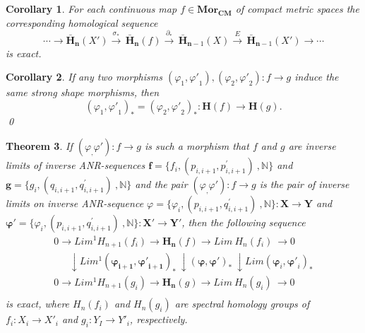\documentclass[10pt]{article}
\newtheorem{theorem}{Theorem}[section]
\newtheorem{corollary}[theorem]{Corollary}
\theoremstyle{definition}
\begin{document}
\begin{corollary} 
For each continuous map $f\in {\mathbf{Mor}}_{\mathbf{CM}}$ of compact metric spaces the corresponding homological sequence
	$$\cdots \to {{\mathbf{\bar{H}}}_{\mathbf{n}}}( {{X}'} )\overset{{{\sigma }_{*}}}{\mathop{\to }}\,{{\mathbf{\bar{H}}}_{\mathbf{n}}}( f )\overset{{{\partial }_{*}}}{\mathop{\to }}\,{{\mathbf{\bar{H}}}_{\mathbf{n}-1}}( X )\overset{E}{\mathop{\to }}\,{{\mathbf{\bar{H}}}_{\mathbf{n}-1}}( {{X}'} )\to \cdots $$
is exact.

\end{corollary}
\begin{corollary} 
If any two morphisms  $( {{\varphi }_{1}},{\varphi'} _{1} ),( {{\varphi }_{2}},{\varphi'} _{2} ):f\to g$ induce the same strong shape morphisms, then
$${{( {{\varphi }_{1}},{\varphi'} _{1} )}_{*}}={{( {{\varphi }_{2}},{\varphi'} _{2} )}_{*}}:\mathbf{H}( f )\to \mathbf{H}( g ).$$ \qed               
\end{corollary}
\begin{theorem} 
If $( {\varphi }_,{\varphi'} ):f\to g$  is such a morphism that $f$ and $g$ are inverse limits of inverse ANR-sequences  $\mathbf{f}= \{ {{f}_{i}},({{p}_{i,i+1}},p_{i,i+1}^{'})~,\mathbb{N} \}$ and $\mathbf{g}= \{ {{g}_{i}},({{q}_{i,i+1}},q_{i,i+1}^{'})~,\mathbb{N} \}$ and the pair $( {\varphi }_,{\varphi'} ):f\to g$ is the pair of inverse limits on inverse ANR-sequence ${\mathbb {\varphi}}= \{ {{\varphi}_{i}},({{p}_{i,i+1}},q_{i,i+1}^{'})~,\mathbb{N} \} : { \mathbf{X} \to \mathbf{Y}}$ and ${\mathbf{\varphi'}}= \{ {{\varphi}_{i}},({{p}_{i,i+1}},q_{i,i+1}^{'})~,\mathbb{N} \}: { \mathbf{X'} \to \mathbf{Y'}}$, then the following sequence 
$$
\begin{matrix}
   0\to Li{{m}^{1}}{{H}_{n+1}}( {{f}_{i}} )\to {{\mathbf{H}}_{\mathbf{n}}}( f )\to Lim~{{H}_{n}}( {{f}_{i}} )~\to 0  \\
   ~~~~~~~\downarrow Li{{m}^{1}} \left( {{\mathbf{\varphi_{i+1} }}},\mathbf{{\varphi'}_{i+1} } \right)_{*}~\downarrow \left( {{\mathbf{\varphi }}},\mathbf{{\varphi}' } \right)_{*}~\downarrow Lim \left( {{\mathbf{\varphi }}}_{i},{\mathbf{{\varphi}'}_{i} } \right)_{*} \\
   0\to Li{{m}^{1}}{{H}_{n+1}}( {{g}_{i}} )\to {{\mathbf{H}}_{\mathbf{n}}}( g )\to Lim~{{H}_{n}}( {{g}_{i}} )~\to 0  \\
\end{matrix}
$$
is exact, where ${{H}_{n}}( {{f}_{i}} )$ and ${{H}_{n}}( {{g}_{i}} )$ are spectral homology groups of ${{f}_{i}}: {X_i \to {X'}_i}$ and $g_i: {Y_I \to {Y'}_i} $, respectively.
\end{theorem}
\end{document}
